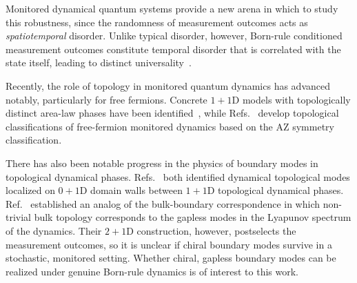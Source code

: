 Monitored dynamical quantum systems provide a new arena in which to study this robustness, since the randomness of measurement outcomes acts as \textit{spatiotemporal} disorder. Unlike typical disorder, however, Born-rule conditioned measurement outcomes constitute temporal disorder that is correlated with the state itself, leading to distinct universality~\cite{JianShapourianBauerLudwig2023,FavaEtAl2023}. 


Recently, the role of topology in monitored quantum dynamics has advanced notably, particularly for free fermions. Concrete $1+1$D models with topologically distinct area-law phases have been identified~\cite{KellsMeidanRomito2023,BehrendsVennBeri2024,PanShapourianJian2025,Oshima2025, yang2026decoding}, while Refs.~\cite{BhuiyanPanJian2026,XiaoKawabata2026} develop topological classifications of free-fermion monitored dynamics based on the AZ symmetry classification.

There has also been notable progress in the physics of boundary modes in topological dynamical phases.  Refs.~\cite{PanShapourianJian2025, Oshima2025} both identified dynamical topological modes localized on $0+1$D domain walls between $1+1$D topological dynamical phases. Ref.~\cite{XiaoKawabata2026}
established an analog of the bulk-boundary correspondence in which non-trivial bulk topology corresponds to the gapless modes in the Lyapunov spectrum of the dynamics. Their $2+1$D construction, however, postselects the measurement outcomes, so it is unclear if chiral boundary modes survive in a stochastic, monitored setting. Whether chiral, gapless boundary modes can be realized under genuine Born-rule dynamics is of interest to this work.

